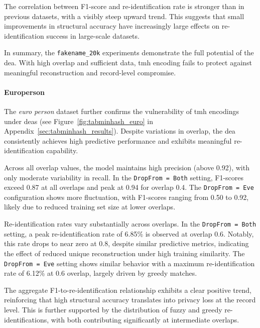 The correlation between F1-score and re-identification rate is stronger than in previous datasets, with a visibly steep upward trend.
This suggests that small improvements in structural accuracy have increasingly large effects on re-identification success in large-scale datasets.



In summary, the \texttt{fakename\_20k} experiments demonstrate the full potential of the \ac{dea}.
With high overlap and sufficient data, \ac{tmh} encoding fails to protect against meaningful reconstruction and record-level compromise.


\paragraph{Europerson}

The \textit{euro person} dataset further confirms the vulnerability of \ac{tmh} encodings under \ac{dea}s (see Figure~\ref{fig:tabminhash_euro} in Appendix~\ref{sec:tabminhash_results}).
Despite variations in overlap, the \ac{dea} consistently achieves high predictive performance and exhibits meaningful re-identification capability.

Across all overlap values, the model maintains high precision (above 0.92), with only moderate variability in recall.
In the \texttt{DropFrom = Both} setting, F1-scores exceed 0.87 at all overlaps and peak at 0.94 for overlap 0.4.
The \texttt{DropFrom = Eve} configuration shows more fluctuation, with F1-scores ranging from 0.50 to 0.92, likely due to reduced training set size at lower overlaps.

Re-identification rates vary substantially across overlaps.
In the \texttt{DropFrom = Both} setting, a peak re-identification rate of 6.85\% is observed at overlap 0.6.
Notably, this rate drops to near zero at 0.8, despite similar predictive metrics, indicating the effect of reduced unique reconstruction under high training similarity.
The \texttt{DropFrom = Eve} setting shows similar behavior with a maximum re-identification rate of 6.12\% at 0.6 overlap, largely driven by greedy matches.

The aggregate F1-to-re-identification relationship exhibits a clear positive trend, reinforcing that high structural accuracy translates into privacy loss at the record level.
This is further supported by the distribution of fuzzy and greedy re-identifications, with both contributing significantly at intermediate overlaps.



